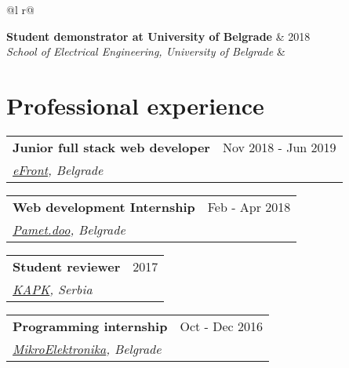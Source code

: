 \documentclass[a4paper,12pt]{article}
\begin{document}
\begin{tabularx}{\linewidth}{ @{}l r@{} }

\textbf{Student demonstrator at University of Belgrade} & \hfill 2018 \\
\textit{School of Electrical Engineering, University of Belgrade} & \\

\end{tabularx}


\section{Professional experience}

\begin{tabularx}{\linewidth}{ @{}l r@{} }
\textbf{Junior full stack web developer} & \hfill Nov 2018 - Jun 2019 \\
\textit{\href{https://www.efront.com/}{eFront}, Belgrade} & \\[3.75pt]
\end{tabularx}

\begin{tabularx}{\linewidth}{ @{}l r@{} }
\textbf{Web development Internship} & \hfill Feb - Apr 2018 \\
\textit{\href{https://vicert.com/}{Pamet.doo}, Belgrade} & \\[3.75pt]
\end{tabularx}

\begin{tabularx}{\linewidth}{ @{}l r@{} }
\textbf{Student reviewer} & \hfill 2017 \\
\textit{\href{http://www.kapk.org/en/home/}{KAPK}, Serbia } & \\[3.75pt]
\end{tabularx}

\begin{tabularx}{\linewidth}{ @{}l r@{} }
\textbf{Programming internship} & \hfill Oct - Dec 2016 \\
\textit{\href{https://www.mikroe.com/}{MikroElektronika}, Belgrade } & \\[3.75pt]
\end{tabularx}
\end{document}
